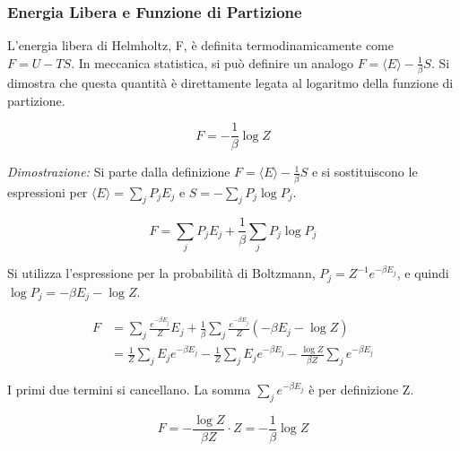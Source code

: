 \subsubsection{Energia Libera e Funzione di Partizione}

L'energia libera di Helmholtz, F, è definita termodinamicamente come $F = U - TS$. In meccanica statistica, si può definire un analogo $F = \langle E \rangle - \frac{1}{\beta} S$. Si dimostra che questa quantità è direttamente legata al logaritmo della funzione di partizione.

\begin{tcolorbox}[colback=yellow!30,  
                  colframe=yellow!50!orange,  
                  boxrule=0.8pt, 
                  arc=3pt,  
                  top=4pt, bottom=4pt, left=6pt, right=6pt,
                  enhanced,
                  sharp corners=south]
\begin{equation}
F = -\frac{1}{\beta} \log Z
\end{equation}
\end{tcolorbox}

\vspace{0.5 cm}
\textit{Dimostrazione:}
Si parte dalla definizione $F = \langle E \rangle - \frac{1}{\beta}S$ e si sostituiscono le espressioni per $\langle E \rangle = \sum_j P_j E_j$ e $S = - \sum_j P_j \log P_j$.

\begin{equation}
F = \sum_j P_j E_j + \frac{1}{\beta} \sum_j P_j \log P_j
\end{equation}

Si utilizza l'espressione per la probabilità di Boltzmann, $P_j = Z^{-1} e^{-\beta E_j}$, e quindi $\log P_j = -\beta E_j - \log Z$.

\begin{equation}
\begin{split}
F & = \sum_j \frac{e^{-\beta E_j}}{Z} E_j + \frac{1}{\beta} \sum_j \frac{e^{-\beta E_j}}{Z} (-\beta E_j - \log Z) \\
& = \frac{1}{Z} \sum_j E_j e^{-\beta E_j} - \frac{1}{Z} \sum_j E_j e^{-\beta E_j} - \frac{\log Z}{\beta Z} \sum_j e^{-\beta E_j}
\end{split}
\end{equation}

I primi due termini si cancellano. La somma $\sum_j e^{-\beta E_j}$ è per definizione Z.

\begin{equation}
F = - \frac{\log Z}{\beta Z} \cdot Z = -\frac{1}{\beta} \log Z
\end{equation}

